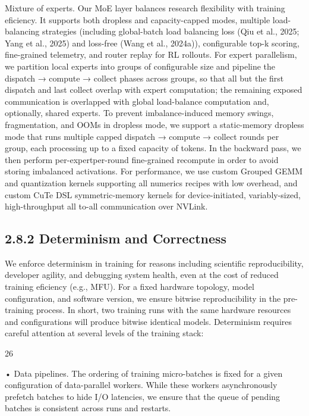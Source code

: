 \documentclass[
  10
]{article}
\begin{document}
Mixture of experts. Our MoE layer balances research flexibility with
training eficiency. It supports both dropless and capacity-capped modes,
multiple load-balancing strategies (including global-batch load
balancing loss (Qiu et al., 2025; Yang et al., 2025) and loss-free (Wang
et al., 2024a)), configurable top-k scoring, fine-grained telemetry, and
router replay for RL rollouts. For expert parallelism, we partition
local experts into groups of configurable size and pipeline the dispatch
→ compute → collect phases across groups, so that all but the first
dispatch and last collect overlap with expert computation; the remaining
exposed communication is overlapped with global load-balance computation
and, optionally, shared experts. To prevent imbalance-induced memory
swings, fragmentation, and OOMs in dropless mode, we support a
static-memory dropless mode that runs multiple capped dispatch → compute
→ collect rounds per group, each processing up to a fixed capacity of
tokens. In the backward pass, we then perform per-expertper-round
fine-grained recompute in order to avoid storing imbalanced activations.
For performance, we use custom Grouped GEMM and quantization kernels
supporting all numerics recipes with low overhead, and custom CuTe DSL
symmetric-memory kernels for device-initiated, variably-sized,
high-throughput all to-all communication over NVLink.

\subsection{2.8.2 Determinism and
Correctness}\label{determinism-and-correctness}

We enforce determinism in training for reasons including scientific
reproducibility, developer agility, and debugging system health, even at
the cost of reduced training eficiency (e.g., MFU). For a fixed hardware
topology, model configuration, and software version, we ensure bitwise
reproducibility in the pre-training process. In short, two training runs
with the same hardware resources and configurations will produce bitwise
identical models. Determinism requires careful attention at several
levels of the training stack:

26

• Data pipelines. The ordering of training micro-batches is fixed for a
given configuration of data-parallel workers. While these workers
asynchronously prefetch batches to hide I/O latencies, we ensure that
the queue of pending batches is consistent across runs and restarts.
\end{document}
